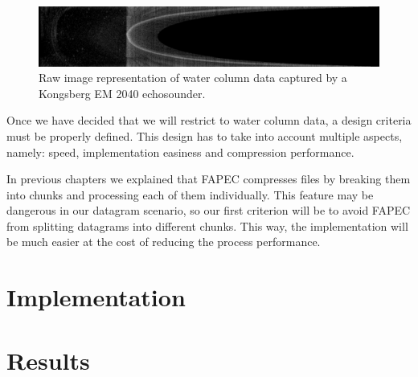 \begin{figure}[h!]
	\begin{center}
		\includegraphics[scale=0.3]{images/water_column_data.png}
	\end{center}
	\caption{Raw image representation of water column data captured by a Kongsberg EM 2040 echosounder.}
	\label{fig:wc_data}
\end{figure}

Once we have decided that we will restrict to water column data, a design criteria must be properly defined. This design has to take into account multiple aspects, namely: speed, implementation easiness and compression performance.

In previous chapters we explained that FAPEC compresses files by breaking them into chunks and processing each of them individually. This feature may be dangerous in our datagram scenario, so our first criterion will be to avoid FAPEC from splitting datagrams into different chunks. This way, the implementation will be much easier at the cost of reducing the process performance.

\section{Implementation}

\section{Results}

